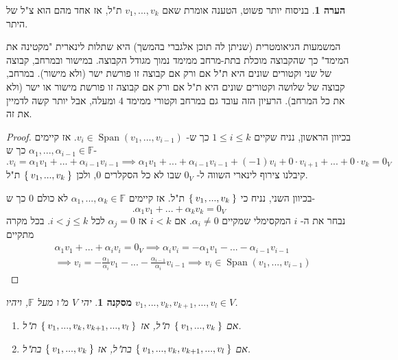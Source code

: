 \documentclass[12pt]{report}
\theoremstyle{plain}
\newtheorem{corollary}[theorem]{מסקנה}
\theoremstyle{definition}
\newtheorem{remark}{הערה}[chapter]
\newcommand{\F}{\mathbb{F}}
\newcommand{\0}{\mathbf{0}}
\DeclareMathOperator{\Span}{Span}
\begin{document}
\begin{remark}
בניסוח יותר פשוט, הטענה אומרת שאם
$v_1,...,v_k$
ת"ל, אז אחד מהם הוא צ"ל של היתר.

המשמעות הגיאומטרית (שניתן לה תוכן אלגברי בהמשך) היא שתלות לינארית "מקטינה את המימד" כך שהקבוצה מוכלת בתת-מרחב ממימד נמוך מגודל הקבוצה. במישור ובמרחב, קבוצה של שני וקטורים שונים היא ת"ל אם ורק אם קבוצה זו פורשת ישר (ולא מישור). במרחב, קבוצה של שלושה וקטורים שונים היא ת"ל אם ורק אם קבוצה זו פורשת מישור או ישר (ולא את כל המרחב). הרעיון הזה עובד גם במרחב וקטורי ממימד 
$4$ 
ומעלה, אבל יותר קשה לדמיין את זה.
\end{remark}

\begin{proof}
בכיוון הראשון, נניח שקיים
$1\leq i\leq k$
כך ש-
$v_i\in\Span(v_1,...,v_{i-1})$.
אז קיימים 
$\alpha_1,...,\alpha_{i-1}\in\F$
כך ש-
$$
.v_i=\alpha_1v_1+...+\alpha_{i-1}v_{i-1} \implies \alpha_1v_1+...+\alpha_{i-1}v_{i-1}+(-1)v_i+0\cdot v_{i+1}+...+0\cdot v_k=0_V
$$
קיבלנו צירוף לינארי השווה ל-
$0_V$
שבו לא כל הסקלרים 
$0$,
ולכן
$\Set{v_1,...,v_k}$
ת"ל.

בכיוון השני, נניח כי
$\Set{v_1,...,v_k}$
ת"ל. אז קיימים
$\alpha_1,...,\alpha_k\in\F$
לא כולם
$0$
כך ש-
$$
.\alpha_1v_1+...+\alpha_kv_k=0_V
$$
נבחר את ה-
$i$
המקסימלי שמקיים
$\alpha_i\neq0$.
אם
$i<k$
אז
$\alpha_j=0$
לכל
$i<j\leq k$. 
בכל מקרה מתקיים
$$
\begin{aligned}
&\alpha_1v_1+...+\alpha_iv_i=0_V \implies \alpha_iv_i=-\alpha_1v_1-...-\alpha_{i-1}v_{i-1} \\
&\implies v_i=-\frac{\alpha_1}{\alpha_i}v_1-...-\frac{\alpha_{i-1}}{\alpha_i}v_{i-1} \implies v_i\in\Span(v_1,...,v_{i-1})
\end{aligned}
$$
\end{proof}

\begin{corollary}
יהי
$V$
מ"ו מעל
$\F$,
ויהיו
$v_1,...,v_k,v_{k+1},...,v_l\in V$.

\begin{enumerate}[label=\alph*.]
\item 
אם 
$\Set{v_1,...,v_k}$
ת"ל, אז
$\Set{v_1,...,v_k,v_{k+1},...,v_l}$
ת"ל.


\item 
אם 
$\Set{v_1,...,v_k,v_{k+1},...,v_l}$
בת"ל, אז
$\Set{v_1,...,v_k}$
בת"ל.


\end{enumerate}
\end{corollary}
\end{document}
